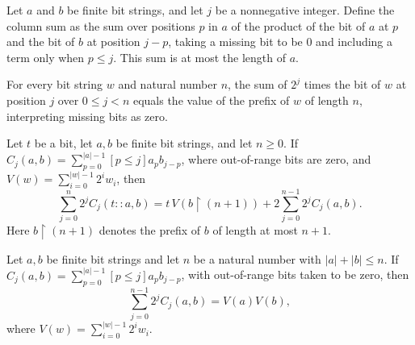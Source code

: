 \begin{lemma}
\label{Complexity.multColumn_le}
\leanok
{}
Let $a$ and $b$ be finite bit strings, and let $j$ be a nonnegative integer. Define the
column sum as the sum over positions $p$ in $a$ of the product of the bit of $a$ at $p$
and the bit of $b$ at position $j-p$, taking a missing bit to be $0$ and including a
term only when $p\le j$. This sum is at most the length of $a$.
\end{lemma}

\begin{lemma}
\label{Complexity.mult_bits_prefix}
\leanok
{}
For every bit string $w$ and natural number $n$, the sum of $2^j$ times the bit of $w$
at position $j$ over $0\le j<n$ equals the value of the prefix of $w$ of length $n$,
interpreting missing bits as zero.
\end{lemma}

\begin{lemma}
\label{Complexity.mult_column_prefix_cons}
\leanok
{}
Let $t$ be a bit, let $a,b$ be finite bit strings, and let $n\ge 0$. If
$C_j(a,b)=\sum_{p=0}^{|a|-1} [p\le j]a_p b_{j-p}$, where out-of-range bits are zero, and
$V(w)=\sum_{i=0}^{|w|-1}2^i w_i$, then
\[\sum_{j=0}^{n}2^j C_j(t::a,b)=t\,V(b\mathbin{\upharpoonright}(n+1))+2\sum_{j=0}^{n-1}2^j C_j(a,b).\]
Here $b\mathbin{\upharpoonright}(n+1)$ denotes the prefix of $b$ of length at most
$n+1$.
\end{lemma}

\begin{lemma}
\label{Complexity.mult_columns_value}
\leanok
{}
Let $a,b$ be finite bit strings and let $n$ be a natural number with $|a|+|b|\le n$. If
$C_j(a,b)=\sum_{p=0}^{|a|-1}[p\le j]a_p b_{j-p}$, with out-of-range bits taken to be
zero, then
\[\sum_{j=0}^{n-1}2^j C_j(a,b)=V(a)V(b),\]
where $V(w)=\sum_{i=0}^{|w|-1}2^i w_i$.
\end{lemma}

